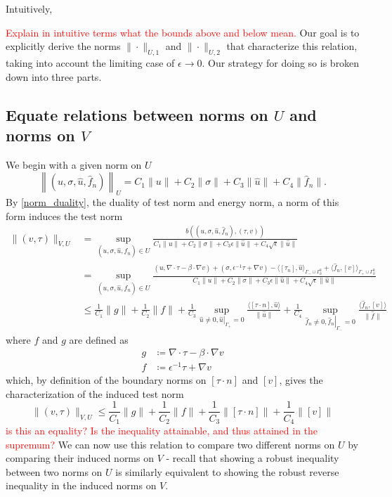 \documentclass[11pt,onecolumn]{scrartcl}
\newcommand{\grad}{\nabla}
\renewcommand{\div}{\grad \cdot}
\begin{document}
Intuitively, 
  
\textcolor{red}{Explain in intuitive terms what the bounds above and below mean.}
Our goal is to explicitly derive the norms $\|\cdot\|_{U,1}$ and $\|\cdot\|_{U,2}$ that characterize this relation, taking into account the limiting case of $\epsilon \rightarrow 0$. 
Our strategy for doing so is broken down into three parts.  

\subsection{Equate relations between norms on $U$ and norms on $V$}
\label{sec:strategy1}
We begin with a given norm on $U$
\[
\left\|\left(u,\sigma,\widehat{u},\widehat{f}_n\right)\right\|_U = C_1 \|u\| + C_2 \|\sigma\| + C_3 \|\widehat{u}\| + C_4 \|\widehat{f}_n\|.
\]
By \eqref{norm_duality}, the duality of test norm and energy norm, a norm of this form induces the test norm
\begin{align*}
\|\left(v,\tau\right)\|_{V,U} &= \sup_{\left(u,\sigma,\widehat{u},\widehat{f}_n\right)\in U}\frac{b\left(\left(u,\sigma,\widehat{u},\widehat{f}_n\right),\left(\tau,v\right)\right)}{C_1\|u\| + C_2\|\sigma\| + C_3\epsilon\|\widehat{u}\|+ C_4\sqrt{\epsilon}\|\widehat{u}\|}\\
&= \sup_{\left(u,\sigma,\widehat{u},\widehat{f}_n\right)\in U}\frac{\left(u,\div \tau - \beta \cdot \grad v\right) + \left(\sigma, \epsilon^{-1} \tau + \grad v\right) - \langle \left[\tau_n\right], \widehat{u} \rangle_{\Gamma_-\cup \Gamma_h^0} + \langle \widehat{f}_n, \left[v\right] \rangle_{\Gamma_+ \cup \Gamma_h^0}}{C_1\|u\| + C_2\|\sigma\| + C_3\epsilon\|\widehat{u}\|+ C_4\sqrt{\epsilon}\|\widehat{u}\|}\\
& \leq \frac{1}{C_1}\|g\| + \frac{1}{C_2}\|f\| + \frac{1}{C_3}\sup_{\widehat{u}\neq 0, \left.\widehat{u}\right|_{\Gamma_+} = 0} \frac{\langle [\tau\cdot n], \widehat{u}\rangle}{\|\widehat{u}\|} +\frac{1}{C_4}\sup_{\widehat{f}_n\neq 0, \left.\widehat{f}_n\right|_{\Gamma_-}=0}\frac{\langle \widehat{f}_n, [v]\rangle}{\|\widehat{f}\|}
\end{align*}
where $f$ and $g$ are defined as 
\begin{align*}
g &\coloneqq \div \tau - \beta \cdot \grad v\\
f &\coloneqq \epsilon^{-1}\tau + \grad v
\end{align*}
which, by definition of the boundary norms on $[\tau\cdot n]$ and $[v]$, gives the characterization of the induced test norm 
\[
\|\left(v,\tau\right)\|_{V,U} \leq \frac{1}{C_1}\|g\| + \frac{1}{C_2}\|f\| + \frac{1}{C_3}\|[\tau\cdot n]\| + \frac{1}{C_4}\|[v]\|
\]
\textcolor{red}{is this an equality? Is the inequality attainable, and thus attained in the supremum?} We can now use this relation to compare two different norms on $U$ by comparing their induced norms on $V$ - recall that showing a robust inequality between two norms on $U$ is similarly equivalent to showing the robust reverse inequality in the induced norms on $V$.  
\end{document}
